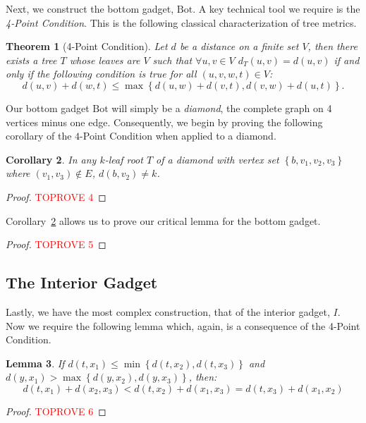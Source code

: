 \documentclass[11pt,letter]{article}
\newtheorem{theorem}{Theorem}[section]
\newtheorem{lemma}[theorem]{Lemma}
\newtheorem{corollary}[theorem]{Corollary}
\theoremstyle{remark}
\newcommand{\B}{\text{Bot}}
\newcommand{\set}[1]{\left\{#1\right\}}
\begin{document}
Next, we construct the bottom gadget, $\B$. 
A key technical tool we require is the {\em 4-Point Condition}. 
This is the following classical characterization of tree metrics. 
\begin{theorem}[4-Point Condition]\label{thm:4-PC} \cite{BUNEMAN197448}
    Let $d$ be a distance on a finite set $V$, then there exists a tree $T$ whose leaves are $V$ such that $\forall u,v\in V$ $d_T(u,v)=d(u,v)$ if and only if the following condition is true for all $(u,v,w,t)\in V$:
    \[d(u,v)+d(w,t)\leq \max\set{d(u,w)+d(v,t),d(v,w)+d(u,t)}.\]
\end{theorem}

Our bottom gadget $\B$ will simply be a {\em diamond}, the complete graph on 4 vertices minus one edge.
Consequently, we begin by proving the following corollary of the $4$-Point Condition when applied to a diamond.

\begin{corollary}\label{cor:diamond}
    In any $k$-leaf root $T$ of a diamond with vertex set $\set{b,v_1,v_2,v_3}$ where $(v_1,v_3)\notin E$, $d(b,v_2)\neq k$.
\end{corollary}

\begin{proof}\textcolor{red}{TOPROVE 4}\end{proof}

Corollary~\ref{cor:diamond} allows us to prove our critical lemma for the bottom gadget.

\bot*

\begin{proof}\textcolor{red}{TOPROVE 5}\end{proof}



\subsection{The Interior Gadget}\label{sec:int}

Lastly, we have the most complex construction, that of 
the interior gadget, $I$. 
Now we require the following lemma which, again, is a consequence of the 4-Point Condition.

\begin{lemma}\label{lem:closer}
    If $d(t,x_1)\leq \min\set{d(t,x_2),d(t,x_3)}$ and $d(y,x_1)>\max\set{d(y,x_2),d(y,x_3)}$, then:
    \[d(t,x_1)+d(x_2,x_3)<d(t,x_2)+d(x_1,x_3)=d(t,x_3)+d(x_1,x_2)\]
\end{lemma}

\begin{proof}\textcolor{red}{TOPROVE 6}\end{proof}
\end{document}
